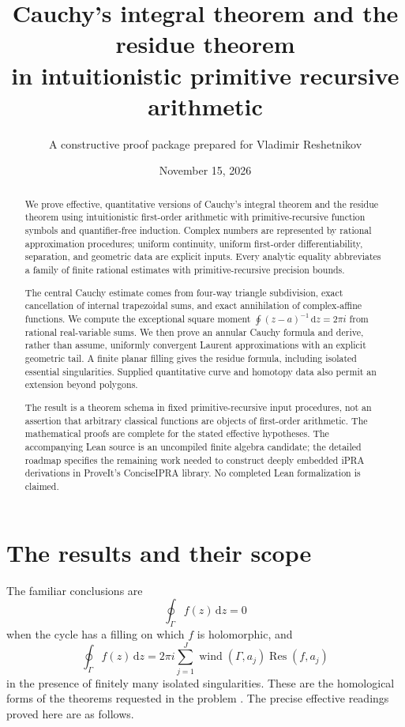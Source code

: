 \documentclass[11pt]{article}
\title{Cauchy's integral theorem and the residue theorem\\in intuitionistic primitive recursive arithmetic}
\author{A constructive proof package prepared for Vladimir Reshetnikov}
\date{November 15, 2026}
\theoremstyle{definition}
\newcommand{\dd}{\,\mathrm d}
\newcommand{\Res}{\operatorname{Res}}
\newcommand{\Wind}{\operatorname{wind}}
\begin{document}
\maketitle
\begin{abstract}
We prove effective, quantitative versions of Cauchy's integral theorem and
the residue theorem using intuitionistic first-order arithmetic with
primitive-recursive function symbols and quantifier-free induction.
Complex numbers are represented by rational approximation procedures;
uniform continuity, uniform first-order differentiability, separation,
and geometric data are explicit inputs. Every analytic equality abbreviates
a family of finite rational estimates with primitive-recursive precision
bounds.

The central Cauchy estimate comes from four-way triangle subdivision,
exact cancellation of internal trapezoidal sums, and exact annihilation of
complex-affine functions. We compute the exceptional square moment
\(\oint (z-a)^{-1}\dd z=2\pi i\) from rational real-variable sums.
We then prove an annular Cauchy formula and derive, rather than assume,
uniformly convergent Laurent approximations with an explicit geometric
tail. A finite planar filling gives the residue formula, including isolated
essential singularities. Supplied quantitative curve and homotopy data
also permit an extension beyond polygons.

The result is a theorem schema in fixed primitive-recursive input
procedures, not an assertion that arbitrary classical functions are
objects of first-order arithmetic. The mathematical proofs are complete
for the stated effective hypotheses. The accompanying Lean source is an
uncompiled finite algebra candidate; the detailed roadmap specifies the
remaining work needed to construct deeply embedded iPRA derivations in
ProveIt's ConciseIPRA library. No completed Lean formalization is claimed.
\end{abstract}
\newpage
\begingroup
\footnotesize
\tableofcontents
\endgroup
\newpage

\section{The results and their scope}\label{sec:scope}

The familiar conclusions are
\begin{equation}\label{eq:maincauchy}
 \oint_\Gamma f(z)\dd z=0
\end{equation}
when the cycle has a filling on which \(f\) is holomorphic, and
\begin{equation}\label{eq:mainresidue}
 \oint_\Gamma f(z)\dd z
   =2\pi i\sum_{j=1}^{J}\Wind(\Gamma,a_j)\Res(f,a_j)
\end{equation}
in the presence of finitely many isolated singularities. These are the
homological forms of the theorems requested in the problem
\cite{wikicauchy,wikiresidue}. The precise effective readings proved here
are as follows.
\end{document}
